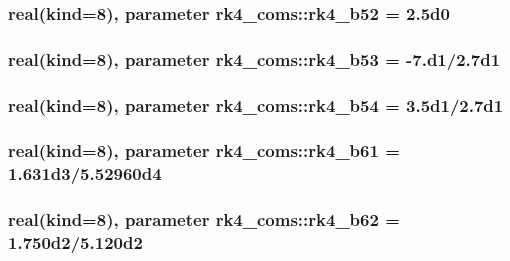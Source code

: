 \subsubsection[{rk4\+\_\+b52}]{\setlength{\rightskip}{0pt plus 5cm}real(kind=8), parameter rk4\+\_\+coms\+::rk4\+\_\+b52 = 2.\+5d0}\label{namespacerk4__coms_a08136775ca79aa4cfb6e2bc844bfb689}
\hypertarget{namespacerk4__coms_adedd306e0a9a351610026b3a12d2e5ce}{}
\subsubsection[{rk4\+\_\+b53}]{\setlength{\rightskip}{0pt plus 5cm}real(kind=8), parameter rk4\+\_\+coms\+::rk4\+\_\+b53 = -\/7.d1/2.\+7d1}\label{namespacerk4__coms_adedd306e0a9a351610026b3a12d2e5ce}
\hypertarget{namespacerk4__coms_a3d702309397c009b9a62c0900da4a7c5}{}
\subsubsection[{rk4\+\_\+b54}]{\setlength{\rightskip}{0pt plus 5cm}real(kind=8), parameter rk4\+\_\+coms\+::rk4\+\_\+b54 = 3.\+5d1/2.\+7d1}\label{namespacerk4__coms_a3d702309397c009b9a62c0900da4a7c5}
\hypertarget{namespacerk4__coms_a69b8b27ac5165b14e52efd1d57e3247d}{}
\subsubsection[{rk4\+\_\+b61}]{\setlength{\rightskip}{0pt plus 5cm}real(kind=8), parameter rk4\+\_\+coms\+::rk4\+\_\+b61 = 1.\+631d3/5.\+52960d4}\label{namespacerk4__coms_a69b8b27ac5165b14e52efd1d57e3247d}
\hypertarget{namespacerk4__coms_a1424e7b77cc58817b30146a6ed80c076}{}
\subsubsection[{rk4\+\_\+b62}]{\setlength{\rightskip}{0pt plus 5cm}real(kind=8), parameter rk4\+\_\+coms\+::rk4\+\_\+b62 = 1.\+750d2/5.\+120d2}\label{namespacerk4__coms_a1424e7b77cc58817b30146a6ed80c076}
\hypertarget{namespacerk4__coms_a2943f8989d0d72c6913d114141dcfe5d}{}
